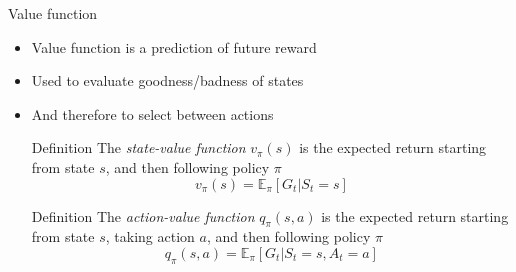 \bgroup
\begin{frame}{Value function}
\begin{itemize}
\item Value function is a prediction of future reward
\item Used to evaluate goodness/badness of states
\item And therefore to select between actions
\begin{block}{Definition}
The \emph{state-value function} $v_{\pi}(s)$ is the expected return starting from state $s$, and then following policy $\pi$
\begin{equation*}
v_{\pi}(s) = \mathbb{E}_{\pi}[G_t | S_t = s]
\end{equation*}
\end{block}
%
\begin{block}{Definition}
The \emph{action-value function} $q_{\pi}(s, a)$ is the expected return starting from state $s$, taking action $a$, and then following policy $\pi$
\begin{equation*}
q_{\pi}(s, a) = \mathbb{E}_{\pi}[G_t | S_t = s, A_t = a]
\end{equation*}
\end{block}
\end{itemize}
\end{frame}
\egroup